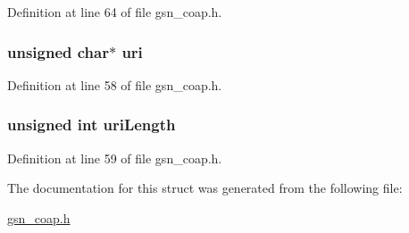 Definition at line 64 of file gsn\_\-coap.h.

\hypertarget{a00040_af2c03b6965ce2fbbb29b97a2818c96a2}{
\subsubsection[{uri}]{\setlength{\rightskip}{0pt plus 5cm}unsigned char$\ast$ {\bf uri}}}
\label{a00040_af2c03b6965ce2fbbb29b97a2818c96a2}


Definition at line 58 of file gsn\_\-coap.h.

\hypertarget{a00040_ac9014e89602db993be93ac49af0826c2}{
\subsubsection[{uriLength}]{\setlength{\rightskip}{0pt plus 5cm}unsigned int {\bf uriLength}}}
\label{a00040_ac9014e89602db993be93ac49af0826c2}


Definition at line 59 of file gsn\_\-coap.h.



The documentation for this struct was generated from the following file:\begin{DoxyCompactItemize}
\item 
\hyperlink{a00478}{gsn\_\-coap.h}\end{DoxyCompactItemize}
